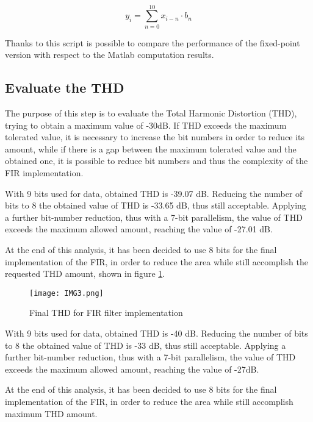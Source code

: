 \paragraph{}

\begin{displaymath}
y_i = \sum_{n=0}^{10}{x_{i-n} \cdot b_n}
\end{displaymath}

Thanks to this script is possible to compare the performance of the fixed-point version with respect to 
the Matlab computation results.

\subsection{Evaluate the THD}

The purpose of this step is to evaluate the Total Harmonic Distortion (THD), trying to obtain a maximum 
value of -30dB. 
If THD exceeds the maximum tolerated value, it is necessary to increase 
the bit numbers in order to reduce its amount, while if there is a gap between the maximum tolerated value 
and the obtained one, it is possible to reduce bit numbers and thus the complexity of the FIR implementation.


With 9 bits used for data, obtained THD is -39.07 dB. 
Reducing the number of bits to 8 the obtained value of THD  
is -33.65 dB, thus still acceptable. 
Applying a further bit-number reduction, thus with a 7-bit parallelism, the value of THD exceeds the maximum allowed
amount, reaching the value of -27.01 dB.

At the end of this analysis, it has been decided to use 8 bits for the final implementation of the  FIR, 
in order to reduce the area while still accomplish the requested THD amount, shown in figure \ref{fig:3}.
\begin{figure}[!h]
	\caption{Final THD for FIR filter implementation}
	\label{fig:3}
	\texttt{[image: IMG3.png]}
	\centering
\end{figure}

With 9 bits used for data, obtained THD is -40 dB. 
Reducing the number of bits to 8 the obtained value of THD  
is -33 dB, thus still acceptable. 
Applying a further bit-number reduction, thus with a 7-bit parallelism, the value of THD exceeds the maximum allowed
amount, reaching the value of -27dB.

At the end of this analysis, it has been decided to use 8 bits for the final implementation of the  FIR, 
in order to reduce the area while still accomplish maximum THD amount.

